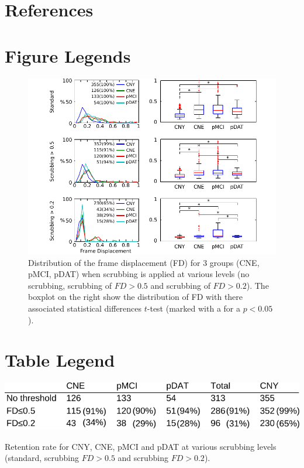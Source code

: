 \documentclass[authoryear]{elsarticle}
\begin{document}
\section*{References}





\pagebreak

\section{Figure Legends}
\begin{figure}[!ht]
\begin{center}
\includegraphics[width=\linewidth]{../figures/figure_fd_distrib.pdf}
\end{center}
\caption{
Distribution of the frame displacement (FD) for 3 groups (CNE, pMCI, pDAT) when scrubbing is applied at various levels (no scrubbing, scrubbing of $FD>0.5$ and scrubbing of $FD>0.2$). The boxplot on the right show the distribution of FD with there associated statistical differences $t$-test (marked with a {\bf *} for a $p<0.05$).
}
\label{fig_dist}
\end{figure}



\section{Table Legend}

\begin{table}[!ht]
\begin{center}
\includegraphics[width=0.75\linewidth]{../figures/table_retention.pdf}
\end{center}
\caption{
Retention rate for CNY, CNE, pMCI and pDAT at various scrubbing levels (standard, scrubbing $FD>0.5$ and scrubbing $FD >0.2$).
}
\label{tab_retention}
\end{table}
\end{document}
